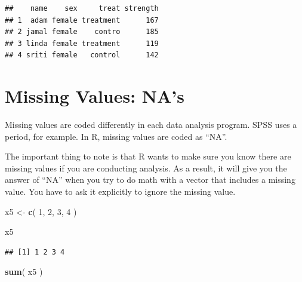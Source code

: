 \documentclass[]{book}
\newenvironment{Shaded}{\begin{snugshade}}{\end{snugshade}}
\newcommand{\CommentTok}[1]{\textcolor[rgb]{0.56,0.35,0.01}{\textit{#1}}}
\newcommand{\DecValTok}[1]{\textcolor[rgb]{0.00,0.00,0.81}{#1}}
\newcommand{\KeywordTok}[1]{\textcolor[rgb]{0.13,0.29,0.53}{\textbf{#1}}}
\newcommand{\NormalTok}[1]{#1}
\newcommand{\OperatorTok}[1]{\textcolor[rgb]{0.81,0.36,0.00}{\textbf{#1}}}
\newcommand{\StringTok}[1]{\textcolor[rgb]{0.31,0.60,0.02}{#1}}
\theoremstyle{definition}
\theoremstyle{definition}
\theoremstyle{definition}
\theoremstyle{remark}
\begin{document}
\begin{Shaded}
\end{Shaded}

\begin{verbatim}
##    name    sex     treat strength
## 1  adam female treatment      167
## 2 jamal female    contro      185
## 3 linda female treatment      119
## 4 sriti female   control      142
\end{verbatim}

\hypertarget{missing-values-nas}{%
\section{Missing Values: NA's}\label{missing-values-nas}}

Missing values are coded differently in each data analysis program. SPSS
uses a period, for example. In R, missing values are coded as ``NA''.

The important thing to note is that R wants to make sure you know there
are missing values if you are conducting analysis. As a result, it will
give you the answer of ``NA'' when you try to do math with a vector that
includes a missing value. You have to ask it explicitly to ignore the
missing value.

\begin{Shaded}
\begin{Highlighting}[]
\NormalTok{x5 <-}\StringTok{ }\KeywordTok{c}\NormalTok{( }\DecValTok{1}\NormalTok{, }\DecValTok{2}\NormalTok{, }\DecValTok{3}\NormalTok{, }\DecValTok{4}\NormalTok{ )}

\NormalTok{x5}
\end{Highlighting}
\end{Shaded}

\begin{verbatim}
## [1] 1 2 3 4
\end{verbatim}

\begin{Shaded}
\begin{Highlighting}[]
\KeywordTok{sum}\NormalTok{( x5 )}
\end{Highlighting}
\end{Shaded}
\end{document}
